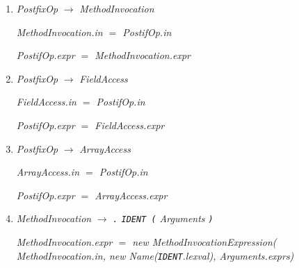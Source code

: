 \documentclass[12pt,a4paper]{scrartcl}
\renewcommand{\prod}[2]{\textit{#1} $\rightarrow$ \textit{#2}}
\newcommand{\tok}[1]{\textnormal{\texttt{#1}}}
\newcommand{\assign}[2]{\textit{#1} $=$ #2}
\newcommand{\new}[2]{\textnormal{new #1(\textit{#2})}}
\newcommand{\attr}[1]{\parbox{\linewidth}{\raggedleft \textit{#1}}}
\begin{document}
\begin{enumerate}
    \item \prod{PostfixOp}{MethodInvocation}\\
        \attr{\assign{MethodInvocation.in}{PostifOp.in}}
        \attr{\assign{PostifOp.expr}{MethodInvocation.expr}}
    \item \prod{PostfixOp}{FieldAccess}\\
        \attr{\assign{FieldAccess.in}{PostifOp.in}}
        \attr{\assign{PostifOp.expr}{FieldAccess.expr}}
    \item \prod{PostfixOp}{ArrayAccess}\\
        \attr{\assign{ArrayAccess.in}{PostifOp.in}}
        \attr{\assign{PostifOp.expr}{ArrayAccess.expr}}
    \item \prod{MethodInvocation}{\tok{.} \tok{IDENT (} Arguments \tok{)}}\\
        \attr{\assign{MethodInvocation.expr}{\new{MethodInvocationExpression}{\\MethodInvocation.in, \new{Name}{\tok{IDENT}.lexval}, Arguments.exprs}}}
    

\end{enumerate}
\end{document}
